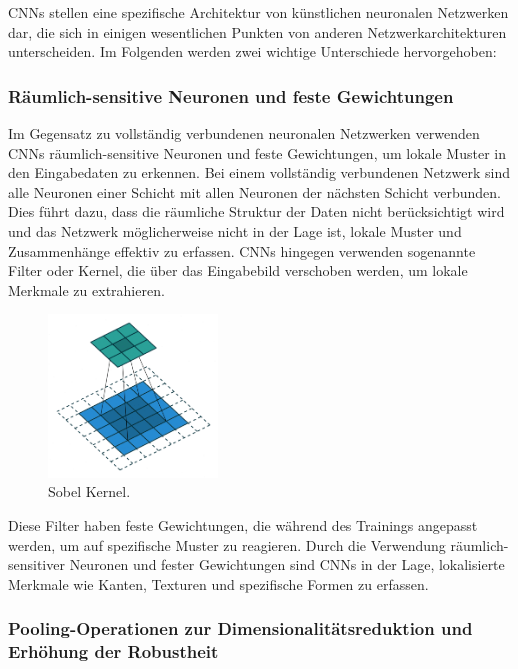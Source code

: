     \acfp{CNN} stellen eine spezifische Architektur von künstlichen neuronalen Netzwerken dar, die sich in einigen wesentlichen Punkten von anderen Netzwerkarchitekturen unterscheiden. 
    Im Folgenden werden zwei wichtige Unterschiede hervorgehoben:

\subsubsection{Räumlich-sensitive Neuronen und feste Gewichtungen}

    Im Gegensatz zu vollständig verbundenen neuronalen Netzwerken verwenden \acp{CNN} räumlich-sensitive Neuronen und feste Gewichtungen, um lokale Muster in den Eingabedaten zu erkennen. 
    Bei einem vollständig verbundenen Netzwerk sind alle Neuronen einer Schicht mit allen Neuronen der nächsten Schicht verbunden. 
    Dies führt dazu, dass die räumliche Struktur der Daten nicht berücksichtigt wird und das Netzwerk möglicherweise nicht in der Lage ist, lokale Muster und Zusammenhänge effektiv zu erfassen. 
    \acp{CNN} hingegen verwenden sogenannte Filter oder Kernel, die über das Eingabebild verschoben werden, um lokale Merkmale zu extrahieren.

    \begin{figure}[h]
        \centering
        \includegraphics[width=0.4\textwidth]{img/cnn_kernel_sobel.png}
        \caption{Sobel Kernel.}
        \label{fig:cnn_kernel_sobel}
    \end{figure}
    
    Diese Filter haben feste Gewichtungen, die während des Trainings angepasst werden, um auf spezifische Muster zu reagieren. 
    Durch die Verwendung räumlich-sensitiver Neuronen und fester Gewichtungen sind \acp{CNN} in der Lage, lokalisierte Merkmale wie Kanten, Texturen und spezifische Formen zu erfassen.

    \subsubsection{Pooling-Operationen zur Dimensionalitätsreduktion und Erhöhung der Robustheit}
    
